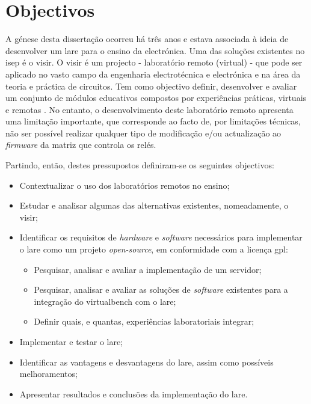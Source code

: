 \section{Objectivos}
\label{sec:Objectivos}
A génese desta dissertação ocorreu há três anos e estava associada à ideia de desenvolver um \acrfull{lare} para o ensino da electrónica. Uma das soluções existentes no \acrfull{isep} é o \acrfull{visir}.
O \acrshort{visir} é um projecto - laboratório remoto (virtual) - que pode ser aplicado no vasto campo da engenharia electrotécnica e electrónica e na área da teoria e práctica de circuitos. Tem como objectivo definir, desenvolver e avaliar um conjunto de módulos educativos compostos por experiências práticas, virtuais e remotas \cite{visirisep}.
No entanto, o desenvolvimento deste laboratório remoto apresenta uma limitação importante, que corresponde ao facto de, por limitações técnicas, não ser possível realizar qualquer tipo de modificação e/ou actualização ao \textit{firmware} da matriz que controla os relés.

Partindo, então, destes pressupostos definiram-se os seguintes objectivos:
\begin{itemize}
    \item Contextualizar o uso dos laboratórios remotos no ensino;
    \item Estudar e analisar algumas das alternativas existentes, nomeadamente, o \acrshort{visir};
    \item Identificar os requisitos de \textit{hardware} e \textit{software} necessários para implementar o \acrshort{lare} como um projeto \textit{open-source}, em conformidade com a licença \acrfull{gpl}:
    \begin{itemize}
        \item Pesquisar, analisar e avaliar a implementação de um servidor;
        \item Pesquisar, analisar e avaliar as soluções de \textit{software} existentes para a integração do \acrfull{virtualbench} com o \acrshort{lare};
         \item Definir quais, e quantas, experiências laboratoriais integrar;
    \end{itemize}
    \item Implementar e testar o \acrshort{lare};
    \item Identificar as vantagens e desvantagens do \acrshort{lare}, assim como possíveis melhoramentos;
    \item Apresentar resultados e conclusões da implementação do \acrshort{lare}.
\end{itemize}

